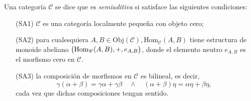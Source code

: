 \documentclass[tesis]{subfiles}
\begin{document}
\begin{Def}\label{Def: Categoría semiaditiva}
    Una categoría $\mathscr{C}$ se dice que es \emph{semiaditiva} si satisface las siguientes condiciones:

    \begin{itemize}

        \item[(SA1)] $\mathscr{C}$ es una categoría localmente pequeña con objeto cero;

        \item [(SA2)] para cualesquiera $A,B\in\text{Obj}(\mathscr{C}), \text{Hom}_\mathscr{C}(A,B)$ tiene estructura de monoide abeliano $\big( \text{Hom}_\mathscr{C}(A,B), \break +,e_{A,B}\big)$, donde el elemento neutro $e_{A,B}$ es el morfismo cero en $\mathscr{C}$.

        \item[(SA3)] la composición de morfismos en $\mathscr{C}$ es bilineal, es decir,
            \[
                \gamma(\alpha+\beta) = \gamma\alpha+\gamma\beta \quad \land \quad (\alpha+\beta)\eta = \alpha\eta + \beta\eta,
            \] 
            cada vez que dichas composiciones tengan sentido.
            
    \end{itemize}
\end{Def}
\end{document}

